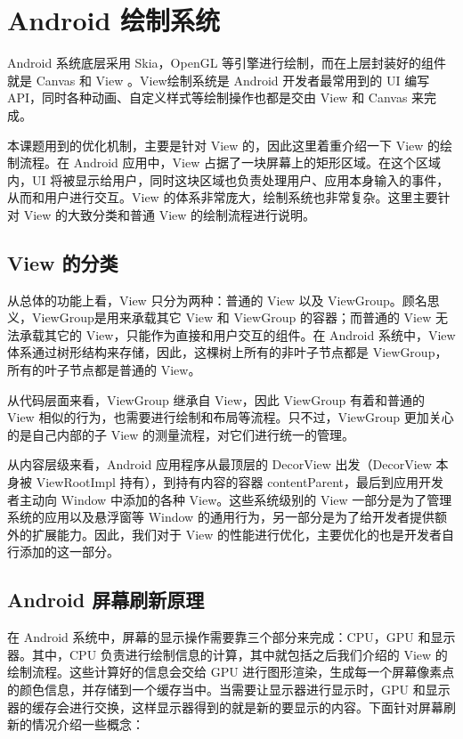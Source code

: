 \chapter{Android 绘制系统}

Android 系统底层采用 Skia，OpenGL 等引擎进行绘制，而在上层封装好的组件就是 Canvas 和 View 。\cite{tahir2013learning}View绘制系统是 Android 开发者最常用到的 UI 编写 API，同时各种动画、自定义样式等绘制操作也都是交由 View 和 Canvas 来完成。

本课题用到的优化机制，主要是针对 View 的，因此这里着重介绍一下 View 的绘制流程。在 Android 应用中，View 占据了一块屏幕上的矩形区域。在这个区域内，UI 将被显示给用户，同时这块区域也负责处理用户、应用本身输入的事件，从而和用户进行交互。View 的体系非常庞大，绘制系统也非常复杂。这里主要针对 View 的大致分类和普通 View 的绘制流程进行说明。

\section{View 的分类}

从总体的功能上看，View 只分为两种：普通的 View 以及 ViewGroup。顾名思义，ViewGroup是用来承载其它 View 和 ViewGroup 的容器；而普通的 View 无法承载其它的 View，只能作为直接和用户交互的组件。在 Android 系统中，View 体系通过树形结构来存储，因此，这棵树上所有的非叶子节点都是 ViewGroup，所有的叶子节点都是普通的 View。

从代码层面来看，ViewGroup 继承自 View，因此 ViewGroup 有着和普通的 View 相似的行为，也需要进行绘制和布局等流程。只不过，ViewGroup 更加关心的是自己内部的子 View 的测量流程，对它们进行统一的管理。

从内容层级来看，Android 应用程序从最顶层的 DecorView 出发（DecorView 本身被 ViewRootImpl 持有），到持有内容的容器 contentParent，最后到应用开发者主动向 Window 中添加的各种 View。这些系统级别的 View 一部分是为了管理系统的应用以及悬浮窗等 Window 的通用行为，另一部分是为了给开发者提供额外的扩展能力。因此，我们对于 View 的性能进行优化，主要优化的也是开发者自行添加的这一部分。

\section{Android 屏幕刷新原理}

在 Android 系统中，屏幕的显示操作需要靠三个部分来完成：CPU，GPU 和显示器。其中，CPU 负责进行绘制信息的计算，其中就包括之后我们介绍的 View 的绘制流程。这些计算好的信息会交给 GPU 进行图形渲染，生成每一个屏幕像素点的颜色信息，并存储到一个缓存当中。当需要让显示器进行显示时，GPU 和显示器的缓存会进行交换，这样显示器得到的就是新的要显示的内容。下面针对屏幕刷新的情况介绍一些概念：

